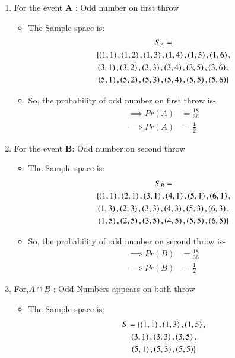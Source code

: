 \documentclass[journal,12pt,twocolumn]{IEEEtran}
\begin{document}
\begin{enumerate}
\item For the event \textbf{A} : Odd number on first throw
\begin{itemize}
\item The Sample space is:
\begin{multline}
    S_A=
    \\
    \{\left(1,1\right),\left(1,2\right),\left(1,3\right),\left(1,4\right),\left(1,5\right),\left(1,6\right),\\\left(3,1\right),\left(3,2\right),\left(3,3\right),\left(3,4\right),\left(3,5\right),\left(3,6\right),\\\left(5,1\right),\left(5,2\right),\left(5,3\right),\left(5,4\right),\left(5,5\right),\left(5,6\right)\}
    \end{multline}
    \item So, the probability of odd number on first throw is-
\begin{align}
\implies  Pr(A) &= \frac{18}{36} 
\\
\implies  Pr(A) &= \frac{1}{2} \label{eqA}
 \end{align}
 \end{itemize}
 \item For the event \textbf{B}: Odd number on second throw
    \begin{itemize}
    \item The Sample space is:
 \begin{multline}
    S_B= 
    \\
    \{\left(1,1\right),\left(2,1\right),\left(3,1\right),\left(4,1\right),\left(5,1\right),\left(6,1\right),\\\left(1,3\right),\left(2,3\right),\left(3,3\right),\left(4,3\right),\left(5,3\right),\left(6,3\right),\\\left(1,5\right),\left(2,5\right),\left(3,5\right),\left(4,5\right),\left(5,5\right),\left(6,5\right)\}
    \end{multline}
    \item So, the probability of odd number on second throw is-
\begin{align}
\implies  Pr(B) &= \frac{18}{36} 
\\
\implies  Pr(B) &= \frac{1}{2} \label{eqB}
 \end{align}
 \end{itemize}
\item For,$A\cap B$ : Odd Numbers appears on both throw
\begin{itemize}
\item The Sample space is:
\begin{multline}
    S=\{\brak{1,1},\brak{1,3},\brak{1,5},\\\brak{3,1},\brak{3,3},\brak{3,5},\\\brak{5,1},\brak{5,3},\brak{5,5}\}

\end{multline}
\end{itemize}
\end{enumerate}
\end{document}
